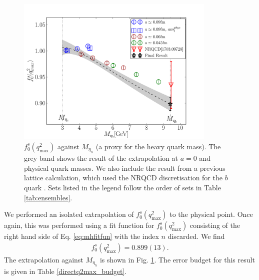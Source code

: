 \begin{figure}[htb!]
  \begin{center}
  \hspace{-10pt}
  \includegraphics[width=0.85\textwidth]{images/BsDs/direct/f0q2max_vsmh.pdf}
  \caption{ $f_0^s(q^2_{\text{max}})$ against $M_{\eta_h}$ (a proxy for the heavy quark mass). The grey band shows the result of the extrapolation at $a=0$ and physical quark masses. We also include the result from a previous lattice calculation, which used the NRQCD discretisation for the $b$ quark \cite{Monahan:2017uby}. Sets listed in the legend follow the order of sets in Table \ref{tab:ensembles}. \label{fig:directq2max}}
  \end{center}
\end{figure}

We performed an isolated extrapolation of $f^s_0(q^2_{\text{max}})$ to the physical point. Once again, this was performed using a fit function for $f^s_0(q^2_{\text{max}})$ consisting of the right hand side of Eq. \eqref{eq:mhfitfun} with the index $n$ discarded. We find
\begin{align}
  f_0^s(q^2_{\text{max}}) = 0.899(13).
  \label{eq:f0s_direct}
\end{align}
The extrapolation against $M_{\eta_h}$ is shown in Fig. \ref{fig:directq2max}. The error budget for this result is given in Table \ref{directq2max_budget}.

